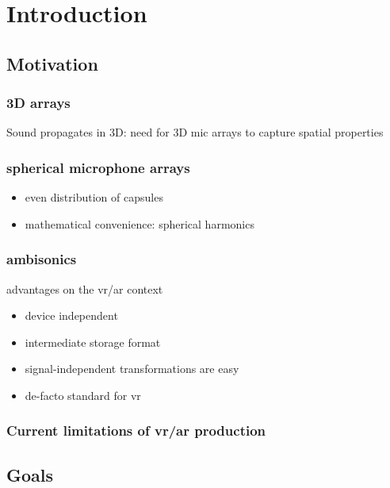 \chapter{Introduction}


\section{Motivation}

\subsection{3D arrays}

Sound propagates in 3D: need for 3D mic arrays to capture spatial properties



\subsection{spherical microphone arrays}

\begin{itemize}
  \item even distribution of capsules
  \item mathematical convenience: spherical harmonics
\end{itemize}



\subsection{ambisonics}


advantages on the vr/ar context
\begin{itemize}
  \item device independent
  \item intermediate storage format
  \item signal-independent transformations are easy
  \item de-facto standard for vr
\end{itemize}

\subsection{Current limitations of vr/ar production}


\section{Goals}

